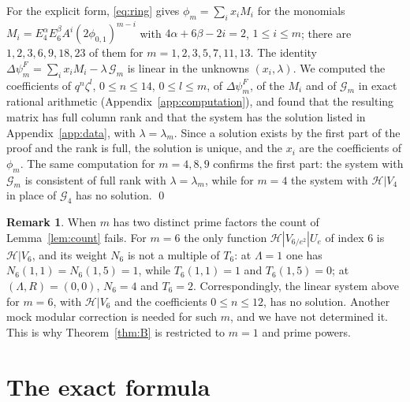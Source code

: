 \documentclass[11pt]{amsart}
\theoremstyle{definition}
\newtheorem{remark}[theorem]{Remark}
\newcommand{\Hc}{\mathcal{H}}
\begin{document}
For the explicit form, \eqref{eq:ring} gives $\phi_m=\sum_i x_iM_i$ for the monomials $M_i=E_4^\alpha E_6^\beta A^i(2\phi_{0,1})^{m-i}$ with $4\alpha+6\beta-2i=2$, $1\le i\le m$; there are $1,2,3,6,9,18,23$ of them for $m=1,2,3,5,7,11,13$. The identity $\Delta\psi^F_m=\sum_ix_iM_i-\lambda\,\mathcal G_m$ is linear in the unknowns $(x_i,\lambda)$. We computed the coefficients of $q^n\zeta^l$, $0\le n\le14$, $0\le l\le m$, of $\Delta\psi^F_m$, of the $M_i$ and of $\mathcal G_m$ in exact rational arithmetic (Appendix~\ref{app:computation}), and found that the resulting matrix has full column rank and that the system has the solution listed in Appendix~\ref{app:data}, with $\lambda=\lambda_m$. Since a solution exists by the first part of the proof and the rank is full, the solution is unique, and the $x_i$ are the coefficients of $\phi_m$. The same computation for $m=4,8,9$ confirms the first part: the system with $\mathcal G_m$ is consistent of full rank with $\lambda=\lambda_m$, while for $m=4$ the system with $\Hc|V_4$ in place of $\mathcal G_4$ has no solution. \qed

\begin{remark}\label{rem:composite}
When $m$ has two distinct prime factors the count of Lemma~\ref{lem:count} fails. For $m=6$ the only function $\Hc|V_{6/e^2}|U_e$ of index $6$ is $\Hc|V_6$, and its weight $N_6$ is not a multiple of $T_6$: at $\Lambda=1$ one has $N_6(1,1)=N_6(1,5)=1$, while $T_6(1,1)=1$ and $T_6(1,5)=0$; at $(\Lambda,R)=(0,0)$, $N_6=4$ and $T_6=2$. Correspondingly, the linear system above for $m=6$, with $\Hc|V_6$ and the coefficients $0\le n\le12$, has no solution. Another mock modular correction is needed for such $m$, and we have not determined it. This is why Theorem~\ref{thm:B} is restricted to $m=1$ and prime powers.
\end{remark}

\section{The exact formula}\label{sec:rademacher}
\end{document}
